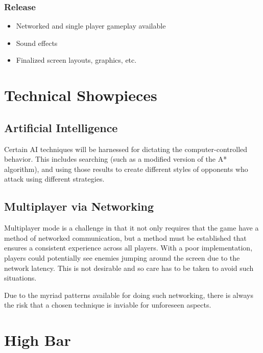 \documentclass[letterpaper,11pt,twoside]{article}
\begin{document}
\subsubsection{Release}
\begin{itemize}
 \item Networked and single player gameplay available
 \item Sound effects
 \item Finalized screen layouts, graphics, etc.
\end{itemize}

\section{Technical Showpieces}

\subsection{Artificial Intelligence}

Certain AI techniques will be harnessed for dictating the computer-controlled behavior. This includes searching (such as a modified version of the A* algorithm), and using those results to create different styles of opponents who attack using different strategies.

\subsection{Multiplayer via Networking}

Multiplayer mode is a challenge in that it not only requires that the game have a method of networked communication, but a method must be established that ensures a consistent experience across all players. With a poor implementation, players could potentially see enemies jumping around the screen due to the network latency. This is not desirable and so care has to be taken to avoid such situations.

Due to the myriad patterns available for doing such networking, there is always the risk that a chosen technique is inviable for unforeseen aspects.

\section{High Bar}
\end{document}
